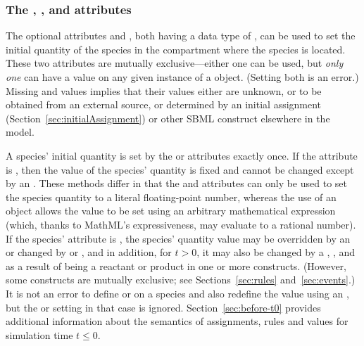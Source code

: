\subsubsection{The ,
  , and  attributes}
\label{sec:initialAmount}
\label{sec:species-substanceunits}

The optional attributes  and
, both having a data type of
, can be used to set the initial quantity of the
species in the compartment where the species is located.  These
two attributes are mutually exclusive---either one can be used,
but \emph{only one} can have a value on any given instance of a
\Species object.  (Setting both is an error.)
Missing  and
 values implies that their values
either are unknown, or to be obtained from an external source, or
determined by an initial assignment
(Section~\ref{sec:initialAssignment}) or other SBML construct
elsewhere in the model.

A species' initial quantity is set by the  or
 attributes exactly once.  If the
 attribute is , then the value of the
species' quantity is fixed and cannot be changed except by an
\InitialAssignment.  These methods differ in that the
 and  attributes
can only be used to set the species quantity to a literal
floating-point number, whereas the use of an \InitialAssignment
object allows the value to be set using an arbitrary mathematical
expression (which, thanks to MathML's expressiveness, may evaluate
to a rational number).  If the species'  attribute
is , the species' quantity value may be overridden by
an \InitialAssignment or changed by \AssignmentRule or
\AlgebraicRule, and in addition, for $t > 0$, it may also be
changed by a \RateRule, \Event, and as a result of being a
reactant or product in one or more \Reaction constructs.  (However, some
constructs are mutually exclusive; see Sections~\ref{sec:rules}
and~\ref{sec:events}.)  It is not an error to define
 or  on a species
and also redefine the value using an \InitialAssignment, but the
 or  setting in
that case is ignored.  Section~\ref{sec:before-t0} provides
additional information about the semantics of assignments, rules
and values for simulation time $t \leq 0$.

